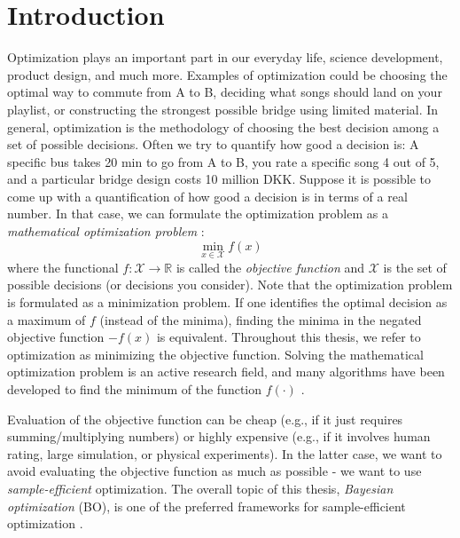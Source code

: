 \chapter{Introduction}



Optimization plays an important part in our everyday life, science development, product design, and
much more. Examples of optimization could be choosing the optimal way to commute from A to B,
deciding what songs should land on your playlist, or constructing the strongest possible bridge
using limited material. In general, optimization is the methodology of choosing the best decision
among a set of possible decisions. Often we try to quantify how good a decision is: A specific bus
takes 20 min to go from A to B, you rate a specific song 4 out of 5, and a particular bridge design
costs 10 million DKK. Suppose it is possible to come up with a quantification of how good a
decision is in terms of a real number. In that case, we can formulate the optimization problem as
a \textit{mathematical optimization problem} \cite[123]{boyd2004convex}: 
$$\min_{x\in \mathcal{X}} f(x)$$ where the functional $f: \mathcal{X} \rightarrow \mathbb{R}$ is
called the \textit{objective function} and $\mathcal{X}$ is the set of possible decisions (or decisions you
consider). Note that the optimization problem is formulated as a minimization problem. If one
identifies the optimal decision as a maximum of $f$ (instead of the minima), finding the minima in
the negated objective function $-f(x)$ is equivalent. Throughout this thesis, we refer to
optimization as minimizing the objective function. Solving the mathematical optimization problem is
an active research field, and many algorithms have been developed to find the minimum of the function
$f(\cdot)$ \cite{boyd2004convex}.

Evaluation of the objective function can be cheap (e.g., if it just requires summing/multiplying
numbers) or highly expensive (e.g., if it involves human rating, large simulation, or physical
experiments). In the latter case, we want to avoid evaluating the objective function as much as
possible - we want to use \textit{sample-efficient} optimization. The overall topic of this thesis,
\textit{Bayesian optimization} (BO), is one of the preferred frameworks for sample-efficient
optimization \cite{TakeHumanOutOfLoop}.

